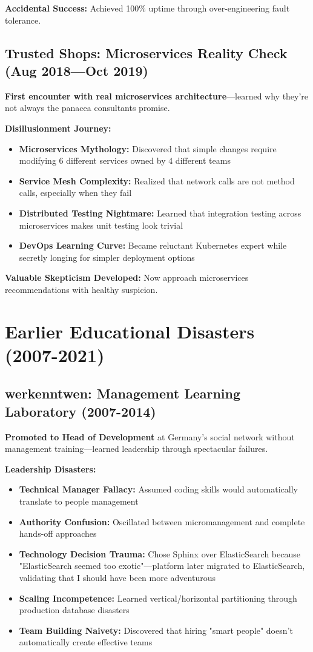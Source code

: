 \documentclass[10pt,a4paper]{article}
\begin{document}
\textbf{Accidental Success:} Achieved 100\% uptime through over-engineering fault tolerance.

\subsection{Trusted Shops: Microservices Reality Check (Aug 2018—Oct 2019)}

\textbf{First encounter with real microservices architecture}—learned why they're not always the panacea consultants promise.

\textbf{Disillusionment Journey:}
\begin{itemize}
\item \textbf{Microservices Mythology:} Discovered that simple changes require modifying 6 different services owned by 4 different teams
\item \textbf{Service Mesh Complexity:} Realized that network calls are not method calls, especially when they fail
\item \textbf{Distributed Testing Nightmare:} Learned that integration testing across microservices makes unit testing look trivial
\item \textbf{DevOps Learning Curve:} Became reluctant Kubernetes expert while secretly longing for simpler deployment options
\end{itemize}

\textbf{Valuable Skepticism Developed:} Now approach microservices recommendations with healthy suspicion.

\section{Earlier Educational Disasters (2007-2021)}

\subsection{werkenntwen: Management Learning Laboratory (2007-2014)}

\textbf{Promoted to Head of Development} at Germany's social network without management training—learned leadership through spectacular failures.

\textbf{Leadership Disasters:}
\begin{itemize}
\item \textbf{Technical Manager Fallacy:} Assumed coding skills would automatically translate to people management
\item \textbf{Authority Confusion:} Oscillated between micromanagement and complete hands-off approaches
\item \textbf{Technology Decision Trauma:} Chose Sphinx over ElasticSearch because "ElasticSearch seemed too exotic"—platform later migrated to ElasticSearch, validating that I should have been more adventurous
\item \textbf{Scaling Incompetence:} Learned vertical/horizontal partitioning through production database disasters
\item \textbf{Team Building Naivety:} Discovered that hiring "smart people" doesn't automatically create effective teams
\end{itemize}
\end{document}
